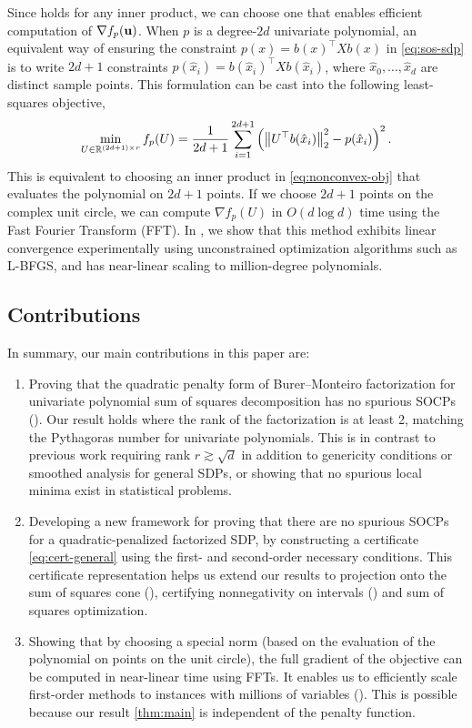 \documentclass[final,onefignum,onetabnum]{siamart220329}
\begin{document}
Since  holds for any inner product, we can choose one that
enables efficient computation of $\nabla f_p(\boldsymbol{\mathbf{u}})$. When $p$ is a
degree-$2d$ univariate polynomial, an equivalent way of ensuring the constraint
$p(x) = b(x)^\top X b(x)$ in \eqref{eq:sos-sdp} is to write $2d+1$ constraints
$p(\hat{x}_i) = b(\hat{x}_i)^\top X b(\hat{x}_i)$, where
$\hat{x}_0, \ldots, \hat{x}_d$ are distinct sample points. This formulation can
be cast into the following least-squares objective,
\begin{align} \label{eq:main-opt}
  \min_{U \in \mathbb{R}^{(2d+1) \times r}} f_p(U)
  = \frac{1}{2d+1} \sum_{i=1}^{2d+1} \left( \left\lVert U^\top b(\hat{x}_i) \right\lVert_2^2 - p(\hat{x}_i) \right)^2.
\end{align}
This is equivalent to choosing an inner product in \eqref{eq:nonconvex-obj} that
evaluates the polynomial on $2d+1$ points. If we choose $2d+1$ points on the
complex unit circle, we can compute $\nabla f_p(U)$ in $O(d \log d)$ time using
the Fast Fourier Transform (FFT). In , we show that this
method exhibits linear convergence experimentally using unconstrained
optimization algorithms such as \mbox{L-BFGS}, and has near-linear scaling to
million-degree polynomials.

\subsection{Contributions}
In summary, our main contributions in this paper are:
\begin{enumerate}
\item Proving that the quadratic penalty form of Burer--Monteiro factorization
  for univariate polynomial sum of squares decomposition has no spurious SOCPs
  (). Our result holds where the rank of the factorization is at
  least 2, matching the Pythagoras number for univariate polynomials. This is in
  contrast to previous work requiring rank $r \gtrsim \sqrt{d}$ in addition to
  genericity conditions or smoothed analysis for general SDPs, or showing that
  no spurious local minima exist in statistical problems.
\item Developing a new framework for proving that there are no spurious SOCPs
  for a quadratic-penalized factorized SDP, by constructing a certificate
  \eqref{eq:cert-general} using the first- and second-order necessary
  conditions. This certificate representation helps us extend our results to
  projection onto the sum of squares cone (), certifying
  nonnegativity on intervals () and sum of squares
  optimization.
\item Showing that by choosing a special norm (based on the evaluation of the
  polynomial on points on the unit circle), the full gradient of the objective
  can be computed in near-linear time using FFTs. It enables us to efficiently
  scale first-order methods to instances with millions of variables
  (). This is possible because our result \eqref{thm:main} is
  independent of the penalty function.
\end{enumerate}
\end{document}
